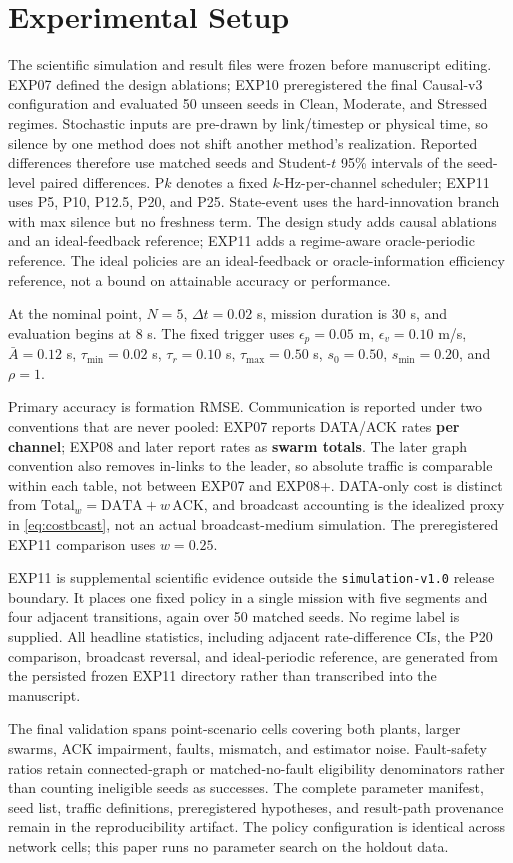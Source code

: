 \section{Experimental Setup}
\label{sec:setup}

The scientific simulation and result files were frozen before manuscript
editing. EXP07 defined the design ablations; EXP10 preregistered the final
Causal-v3 configuration and evaluated 50 unseen seeds in Clean, Moderate, and
Stressed regimes. Stochastic inputs are pre-drawn by link/timestep or physical
time, so silence by one method does not shift another method's realization.
Reported differences therefore use matched seeds and Student-$t$ 95\%
intervals of the seed-level paired differences. P$k$ denotes a fixed
$k$-Hz-per-channel scheduler; EXP11 uses P5, P10, P12.5, P20, and P25.
State-event uses the hard-innovation branch with max silence but no freshness
term. The design study adds causal ablations and an ideal-feedback reference;
EXP11 adds a regime-aware oracle-periodic reference. The ideal policies are
an ideal-feedback or oracle-information efficiency reference, not a bound on
attainable accuracy or performance.

At the nominal point, $N=5$, $\Delta t=0.02$ s, mission duration is 30 s,
and evaluation begins at 8 s. The fixed trigger uses
$\epsilon_p=0.05$ m, $\epsilon_v=0.10$ m/s, $\bar A=0.12$ s,
$\tau_{\min}=0.02$ s, $\tau_r=0.10$ s, $\tau_{\max}=0.50$ s,
$s_0=0.50$, $s_{\min}=0.20$, and $\rho=1$.

Primary accuracy is formation RMSE. Communication is reported under two
conventions that are never pooled: EXP07 reports DATA/ACK rates
\textbf{per channel}; EXP08 and later report rates as \textbf{swarm totals}.
The later graph convention also removes in-links to the leader, so absolute
traffic is comparable within each table, not between EXP07 and EXP08+.
DATA-only cost is distinct from
$\mathrm{Total}_w=\mathrm{DATA}+w\,\mathrm{ACK}$, and broadcast accounting
is the idealized proxy in \eqref{eq:costbcast}, not an actual broadcast-medium
simulation.
The preregistered EXP11 comparison uses $w=0.25$.

EXP11 is supplemental scientific evidence outside the
\texttt{simulation-v1.0} release boundary. It places one fixed policy in a
single mission with five segments and four adjacent transitions, again over
50 matched seeds. No regime label is supplied. All headline statistics,
including adjacent rate-difference CIs, the P20 comparison, broadcast reversal,
and ideal-periodic reference, are generated from the persisted frozen EXP11
directory rather than transcribed into the manuscript.

The final validation spans \MetricTotalCells{} point-scenario cells covering
both plants, larger swarms, ACK impairment, faults, mismatch, and estimator
noise. Fault-safety ratios retain connected-graph or matched-no-fault
eligibility denominators rather than counting ineligible seeds as successes.
The complete parameter manifest, seed list, traffic definitions,
preregistered hypotheses, and result-path provenance remain in the
reproducibility artifact. The policy configuration is identical across
network cells; this paper runs no parameter search on the holdout data.
